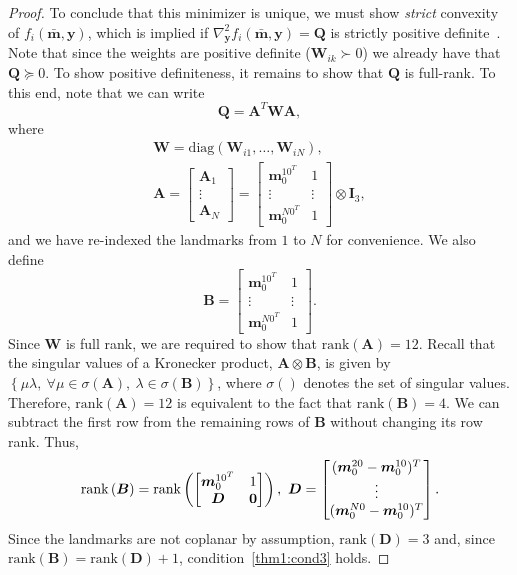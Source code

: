 \documentclass[lettersize,journal]{IEEEtran}
\newcommand{\rank}[1]{\mbox{rank}\left(#1\right)}
\newcommand{\diag}[1]{\mbox{diag}\left(#1\right)}
\begin{document}
\begin{proof}
To conclude that this minimizer is unique, we must show \emph{strict} convexity of $f_i(\bar{\bm{m}},\bm{y})$, which is implied if $\nabla_{\bm{y}}^2 f_i(\bar{\bm{m}},\bm{y}) = \bm{Q} $ is strictly positive definite~\cite{boydConvexOptimization2004}. Note that since the weights are positive definite ($\bm{W}_{ik}\succ 0 $) we already have that $\bm{Q} \succeq 0$. To show positive definiteness, it remains to show that $\bm{Q}$ is full-rank. To this end, note that we can write
\begin{equation}
	\bm{Q} = \bm{A}^T \bm{W} \bm{A},
\end{equation}
where
\begin{gather}
	\bm{W} = \diag{\bm{W}_{i1},\ldots,\bm{W}_{iN}},\\
	\bm{A} = \begin{bmatrix}
		 \bm{A}_1 \\ \vdots \\ \bm{A}_N
	\end{bmatrix} = \begin{bmatrix}
		 \bm{m}_0^{10^T} & 1 \\
		 \vdots& \vdots\\
		 \bm{m}_0^{N0^T} & 1
	\end{bmatrix}\otimes \bm{I}_3,
\end{gather}
and we have re-indexed the landmarks from $1$ to $N$ for convenience. We also define
\begin{equation*}
	\bm{B} = \begin{bmatrix}
		\bm{m}_0^{10^T} & 1 \\
		\vdots&\vdots\\
		\bm{m}_0^{N0^T} & 1
	\end{bmatrix}.
\end{equation*}
Since $\bm{W}$ is full rank, we are required to show that $\rank{\bm{A}} = 12$. 
Recall that the singular values  of a Kronecker product, $\bm{A}\otimes\bm{B}$, is given by $\left\{ \mu\lambda,~ \forall \mu \in \sigma(\bm{A}),~ \lambda \in \sigma(\bm{B})\right\}$, where $\sigma()$ denotes the set of singular values.
Therefore, $\rank{\bm{A}} = 12$ is equivalent to the fact that $\rank{\bm{B}}=4$. We can subtract the first row from the remaining rows of $\bm{B}$ without changing its row rank. Thus,
\begin{equation*}
	\rank{\bm{B}} = \rank{\begin{bmatrix}
			\bm{m}_0^{10^T} & 1 \\
			\bm{D} & \bm{0}
		\end{bmatrix}}, ~ \bm{D} = \begin{bmatrix}
		(\bm{m}_0^{20}-\bm{m}_0^{10})^T  \\
		\vdots\\
		(\bm{m}_0^{N0}-\bm{m}_0^{10})^T 
	\end{bmatrix}.\\	
\end{equation*}
Since the landmarks are not coplanar by assumption, $\rank{\bm{D}}=3$ and, since $\rank{\bm{B}} = \rank{\bm{D}} + 1$, condition~\ref{thm1:cond3} holds.
 

\end{proof}
\end{document}
